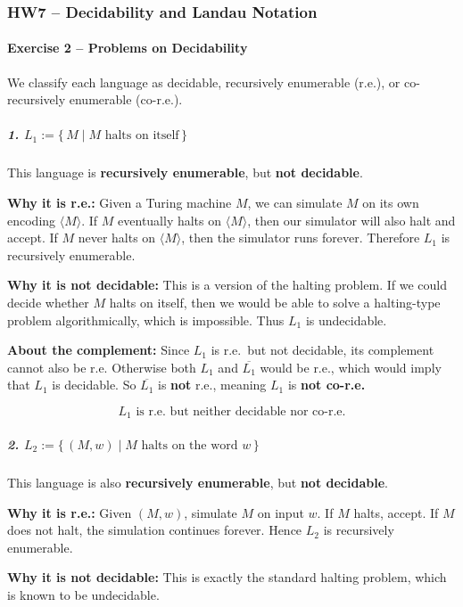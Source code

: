 \documentclass[11pt, a4paper]{article}
\theoremstyle{definition}
\theoremstyle{remark}
\begin{document}
\subsubsection*{HW7 -- Decidability and Landau Notation}

\paragraph{Exercise 2 -- Problems on Decidability}

We classify each language as decidable, recursively enumerable (r.e.), or co-recursively enumerable (co-r.e.).

\subparagraph{1. $L_1 := \{\, M \mid M \text{ halts on itself} \,\}$}

This language is \textbf{recursively enumerable}, but \textbf{not decidable}.

\textbf{Why it is r.e.:}
Given a Turing machine $M$, we can simulate $M$ on its own encoding $\langle M \rangle$.
If $M$ eventually halts on $\langle M \rangle$, then our simulator will also halt and accept.
If $M$ never halts on $\langle M \rangle$, then the simulator runs forever.
Therefore $L_1$ is recursively enumerable.

\textbf{Why it is not decidable:}
This is a version of the halting problem.
If we could decide whether $M$ halts on itself, then we would be able to solve a halting-type problem algorithmically, which is impossible.
Thus $L_1$ is undecidable.

\textbf{About the complement:}
Since $L_1$ is r.e.\ but not decidable, its complement cannot also be r.e.
Otherwise both $L_1$ and $\overline{L_1}$ would be r.e., which would imply that $L_1$ is decidable.
So $\overline{L_1}$ is \textbf{not} r.e., meaning $L_1$ is \textbf{not co-r.e.}

\[
\boxed{L_1 \text{ is r.e.\ but neither decidable nor co-r.e.}}
\]

\subparagraph{2. $L_2 := \{\, (M,w) \mid M \text{ halts on the word } w \,\}$}

This language is also \textbf{recursively enumerable}, but \textbf{not decidable}.

\textbf{Why it is r.e.:}
Given $(M,w)$, simulate $M$ on input $w$.
If $M$ halts, accept.
If $M$ does not halt, the simulation continues forever.
Hence $L_2$ is recursively enumerable.

\textbf{Why it is not decidable:}
This is exactly the standard halting problem, which is known to be undecidable.
\end{document}
